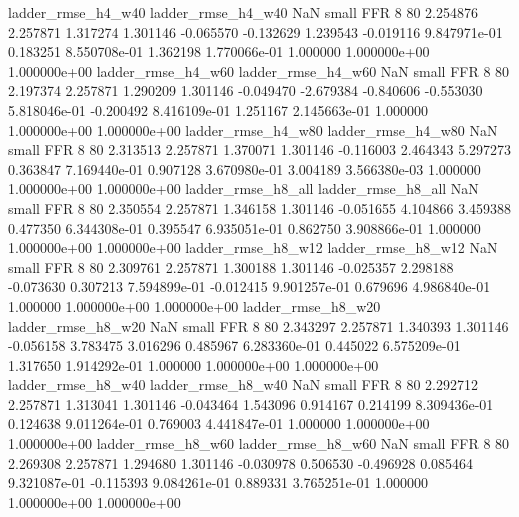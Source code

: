       ladder_rmse_h4_w40       ladder_rmse_h4_w40                   NaN      small      FFR                 8 80 2.254876       2.257871 1.317274       1.301146   -0.065570     -0.132629      1.239543    -0.019116   9.847971e-01  0.183251 8.550708e-01     1.362198   1.770066e-01            1.000000    1.000000e+00        1.000000e+00
      ladder_rmse_h4_w60       ladder_rmse_h4_w60                   NaN      small      FFR                 8 80 2.197374       2.257871 1.290209       1.301146   -0.049470     -2.679384     -0.840606    -0.553030   5.818046e-01 -0.200492 8.416109e-01     1.251167   2.145663e-01            1.000000    1.000000e+00        1.000000e+00
      ladder_rmse_h4_w80       ladder_rmse_h4_w80                   NaN      small      FFR                 8 80 2.313513       2.257871 1.370071       1.301146   -0.116003      2.464343      5.297273     0.363847   7.169440e-01  0.907128 3.670980e-01     3.004189   3.566380e-03            1.000000    1.000000e+00        1.000000e+00
      ladder_rmse_h8_all       ladder_rmse_h8_all                   NaN      small      FFR                 8 80 2.350554       2.257871 1.346158       1.301146   -0.051655      4.104866      3.459388     0.477350   6.344308e-01  0.395547 6.935051e-01     0.862750   3.908866e-01            1.000000    1.000000e+00        1.000000e+00
      ladder_rmse_h8_w12       ladder_rmse_h8_w12                   NaN      small      FFR                 8 80 2.309761       2.257871 1.300188       1.301146   -0.025357      2.298188     -0.073630     0.307213   7.594899e-01 -0.012415 9.901257e-01     0.679696   4.986840e-01            1.000000    1.000000e+00        1.000000e+00
      ladder_rmse_h8_w20       ladder_rmse_h8_w20                   NaN      small      FFR                 8 80 2.343297       2.257871 1.340393       1.301146   -0.056158      3.783475      3.016296     0.485967   6.283360e-01  0.445022 6.575209e-01     1.317650   1.914292e-01            1.000000    1.000000e+00        1.000000e+00
      ladder_rmse_h8_w40       ladder_rmse_h8_w40                   NaN      small      FFR                 8 80 2.292712       2.257871 1.313041       1.301146   -0.043464      1.543096      0.914167     0.214199   8.309436e-01  0.124638 9.011264e-01     0.769003   4.441847e-01            1.000000    1.000000e+00        1.000000e+00
      ladder_rmse_h8_w60       ladder_rmse_h8_w60                   NaN      small      FFR                 8 80 2.269308       2.257871 1.294680       1.301146   -0.030978      0.506530     -0.496928     0.085464   9.321087e-01 -0.115393 9.084261e-01     0.889331   3.765251e-01            1.000000    1.000000e+00        1.000000e+00
